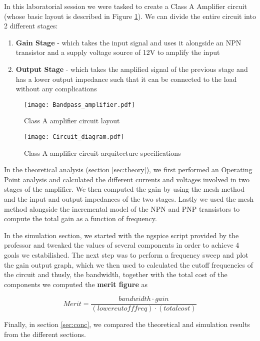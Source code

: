 \hspace{12pt} In this laboratorial session we were tasked to create a Class A Amplifier circuit (whose basic layout is described in Figure \ref{fig:amp}). We can divide the entire circuit into 2 different stages:
\vspace{-5pt}
\begin{enumerate}
	\item{\textbf{Gain Stage} - which takes the input signal and uses it alongside an NPN transistor and a supply voltage source of 12V to amplify the input}
	\vspace{-5pt}
	\item{\textbf{Output Stage} - which takes the amplified signal of the previous stage and has a lower output impedance such that it can be connected to the load without any complications}
\end{enumerate}

\begin{figure}[h]
	\centering
	\texttt{[image: Bandpass\_amplifier.pdf]}
	\caption{Class A amplifier circuit layout}
	\label{fig:amp}
\end{figure}
\vspace{-10pt}
\begin{figure}[h]
 	\centering
	\texttt{[image: Circuit\_diagram.pdf]}
	\caption{Class A amplifier circuit arquitecture specifications}
	\label{fig:circuit}
\end{figure}
 
In the theoretical analysis (section \ref{sec:theory}), we first performed an Operating Point analysis and calculated the different currents and voltages involved in two stages of the amplifier. We then computed the gain by using the mesh method and the input and output impedances of the two stages. Lastly we used the mesh method alongside the incremental model of the NPN and PNP transistors to compute the total gain as a function of frequency.

In the simulation section, we started with the ngspice script provided by the professor and tweaked the values of several components in order to achieve 4 goals we estabilished. The next step was to perform a frequency sweep and plot the gain output graph, which we then used to calculated the cutoff frequencies of the circuit and thusly, the bandwidth, together with the total cost of the components we computed the \textbf{merit figure} as 

\begin{equation}
	Merit = \frac{bandwidth \cdot gain}{(lower cutoff freq) \cdot (total cost)}
\end{equation} 

Finally, in section \ref{sec:conc}, we compared the theoretical and simulation results from the different sections.

\pagebreak
